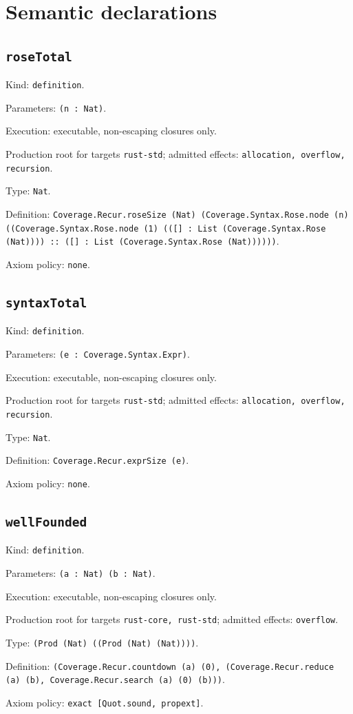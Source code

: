 \documentclass[11pt]{article}
\begin{document}
\section*{Semantic declarations}
\subsection*{\texttt{roseTotal}}
\noindent Kind: \texttt{definition}.\par
\noindent Parameters: \texttt{(n : Nat)}.\par
\noindent Execution: executable, non-escaping closures only.\par
\noindent Production root for targets \texttt{rust-std}; admitted effects: \texttt{allocation, overflow, recursion}.\par
\noindent Type: \texttt{Nat}.\par
\noindent Definition: \texttt{Coverage.Recur.roseSize (Nat) (Coverage.Syntax.Rose.node (n) ((Coverage.Syntax.Rose.node (1) (([] : List (Coverage.Syntax.Rose (Nat)))) :: ([] : List (Coverage.Syntax.Rose (Nat))))))}.\par
\noindent Axiom policy: \texttt{none}.\par
\subsection*{\texttt{syntaxTotal}}
\noindent Kind: \texttt{definition}.\par
\noindent Parameters: \texttt{(e : Coverage.Syntax.Expr)}.\par
\noindent Execution: executable, non-escaping closures only.\par
\noindent Production root for targets \texttt{rust-std}; admitted effects: \texttt{allocation, overflow, recursion}.\par
\noindent Type: \texttt{Nat}.\par
\noindent Definition: \texttt{Coverage.Recur.exprSize (e)}.\par
\noindent Axiom policy: \texttt{none}.\par
\subsection*{\texttt{wellFounded}}
\noindent Kind: \texttt{definition}.\par
\noindent Parameters: \texttt{(a : Nat) (b : Nat)}.\par
\noindent Execution: executable, non-escaping closures only.\par
\noindent Production root for targets \texttt{rust-core, rust-std}; admitted effects: \texttt{overflow}.\par
\noindent Type: \texttt{(Prod (Nat) ((Prod (Nat) (Nat))))}.\par
\noindent Definition: \texttt{(Coverage.Recur.countdown (a) (0), (Coverage.Recur.reduce (a) (b), Coverage.Recur.search (a) (0) (b)))}.\par
\noindent Axiom policy: \texttt{exact [Quot.sound, propext]}.\par
\end{document}
